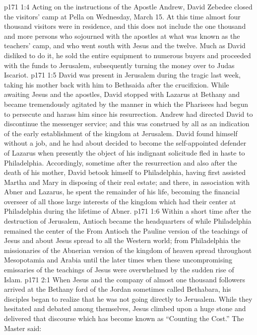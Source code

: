 \vs p171 1:4 Acting on the instructions of the Apostle Andrew, David Zebedee closed the visitors’ camp at Pella on Wednesday, March 15. At this time almost four thousand visitors were in residence, and this does not include the one thousand and more persons who sojourned with the apostles at what was known as the teachers’ camp, and who went south with Jesus and the twelve. Much as David disliked to do it, he sold the entire equipment to numerous buyers and proceeded with the funds to Jerusalem, subsequently turning the money over to Judas Iscariot.
\vs p171 1:5 \pc David was present in Jerusalem during the tragic last week, taking his mother back with him to Bethsaida after the crucifixion. While awaiting Jesus and the apostles, David stopped with Lazarus at Bethany and became tremendously agitated by the manner in which the Pharisees had begun to persecute and harass him since his resurrection. Andrew had directed David to discontinue the messenger service; and this was construed by all as an indication of the early establishment of the kingdom at Jerusalem. David found himself without a job, and he had about decided to become the self\hyp{}appointed defender of Lazarus when presently the object of his indignant solicitude fled in haste to Philadelphia. Accordingly, sometime after the resurrection and also after the death of his mother, David betook himself to Philadelphia, having first assisted Martha and Mary in disposing of their real estate; and there, in association with Abner and Lazarus, he spent the remainder of his life, becoming the financial overseer of all those large interests of the kingdom which had their center at Philadelphia during the lifetime of Abner.
\vs p171 1:6 Within a short time after the destruction of Jerusalem, Antioch became the headquarters of  while Philadelphia remained the center of the  From Antioch the Pauline version of the teachings of Jesus and about Jesus spread to all the Western world; from Philadelphia the missionaries of the Abnerian version of the kingdom of heaven spread throughout Mesopotamia and Arabia until the later times when these uncompromising emissaries of the teachings of Jesus were overwhelmed by the sudden rise of Islam.
\vs p171 2:1 When Jesus and the company of almost one thousand followers arrived at the Bethany ford of the Jordan sometimes called Bethabara, his disciples began to realize that he was not going directly to Jerusalem. While they hesitated and debated among themselves, Jesus climbed upon a huge stone and delivered that discourse which has become known as “Counting the Cost.” The Master said:
